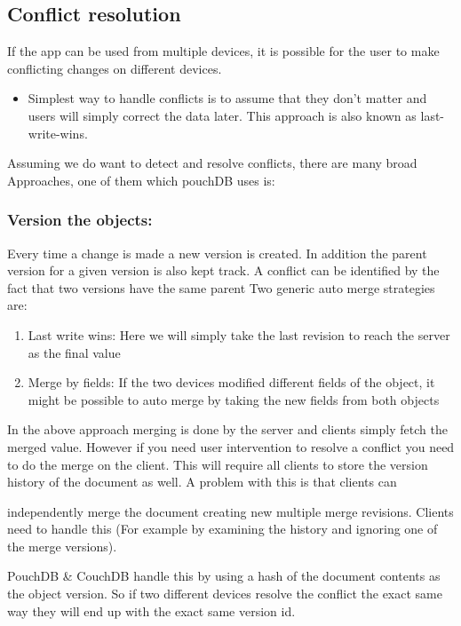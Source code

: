 
\subsection{Conflict resolution}
If the app can be used from multiple devices, it is possible for the user to make conflicting changes on different devices.

\begin{itemize}
    \item Simplest way to handle conflicts is to assume that they don’t matter and users will simply correct the data later. This approach is also known as last-write-wins.
\end{itemize}

Assuming we do want to detect and resolve conflicts, there are many broad
Approaches, one of them which pouchDB uses is:

\subsubsection{Version the objects:}

Every time a change is made a new version is created. In addition the parent version for a given version is also kept track. A conflict can be identified by the fact that two versions have the same parent
Two generic auto merge strategies are:

\begin{enumerate}
    \item Last write wins: Here we will simply take the last revision to reach the server as the final value
    \item Merge by fields: If the two devices modified different fields of the object, it might be possible to auto merge by taking the new fields from both objects
\end{enumerate}

In the above approach merging is done by the server and clients simply fetch the merged value. However if you need user intervention to resolve a conflict you need to do the merge on the client. This will require all clients to store the version history of the document as well. A problem with this is that clients can

independently merge the document creating new multiple merge revisions. Clients need to handle this (For example by examining the history and ignoring one of the merge versions).

PouchDB & CouchDB handle this by using a hash of the document contents as the object version. So if two different devices resolve the conflict the exact same way they will end up with the exact same version id.

